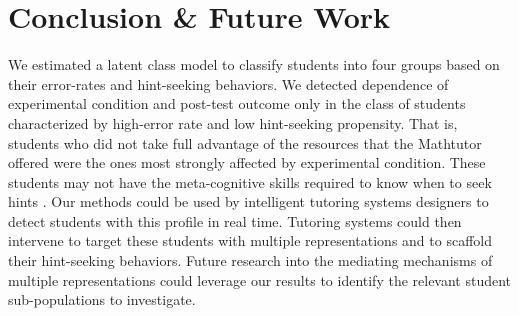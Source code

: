 \documentclass{edm_template}
\begin{document}
\section{Conclusion \& Future Work}
\label{sec:conclusion}

We estimated a latent class model to classify students into four groups based on their error-rates and hint-seeking behaviors. We detected dependence of experimental condition and post-test outcome only in the class of students characterized by high-error rate and low hint-seeking propensity. That is, students who did not take full advantage of the resources that the Mathtutor offered were the ones most strongly affected by experimental condition. These students may not have the meta-cognitive skills required to know when to seek hints \cite{Aleven2006}. Our methods could be used by intelligent tutoring systems designers to detect students with this profile in real time. Tutoring systems could then intervene to target these students with multiple representations and to scaffold their hint-seeking behaviors. Future research into  the mediating mechanisms of multiple representations could leverage our results to identify the relevant student sub-populations to investigate. 



\balancecolumns
\end{document}
